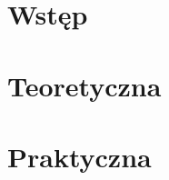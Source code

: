 \documentclass[pdflatex,11pt]{aghdpl}
\author{Michał Mąka}
\date{2013}
\begin{document}
\titlepages

\tableofcontents
\clearpage

\part*{Wstęp}

\part{Teoretyczna}


\part{Praktyczna}








% 
% 
\end{document}
